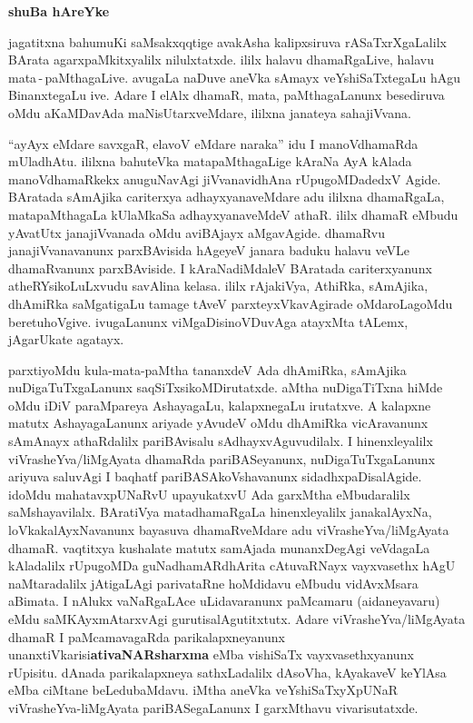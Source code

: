 \begin{center}
{\Huge\bfseries shuBa hAreYke}
\end{center}

\thispagestyle{empty}

\bigskip

jagatitxna bahumuKi saMsakxqqtige avakAsha kalipxsiruva rASaTxrXgaLalilx BArata agarxpaMkitxyalilx nilulxtatxde. ililx halavu dhamaRgaLive, halavu mata\,-\,paMthagaLive. avugaLa naDuve aneVka sAmayx veYshiSaTxtegaLu hAgu BinanxtegaLu ive. Adare I elAlx dhamaR, mata, paMthagaLanunx besediruva oMdu aKaMDavAda maNisUtarxveMdare, ililxna janateya sahajiVvana. 

\medskip

``ayAyx eMdare savxgaR, elavoV eMdare naraka'' idu I manoV\-dhamaRda mUladhAtu. ililxna bahuteVka matapaMthagaLige kAraNa AyA kAlada manoVdhamaRkekx anuguNavAgi jiVvana\-vidhAna rUpugoMDadedxV Agide. BAratada sAmAjika cariterxya adhayxyanaveMdare adu ililxna dhamaRgaLa, matapaMthagaLa kUlaMkaSa \hbox{adhayxyanaveMdeV} athaR. ililx dhamaR eMbudu yAvatUtx janajiVvanada oMdu aviBAjayx aMgavAgide. dhamaRvu janajiVvanavanunx parxBAvisida hAgeyeV janara baduku halavu veVLe dhamaRvanunx parxBAviside. I kAraNadiMdaleV BAratada cariterxyanunx atheRYsikoLuLxvudu savAlina kelasa. ililx \hbox{rAjakiVya}, AthiRka, sAmAjika, dhAmiRka saMgatigaLu tamage tAveV parxteyxVkavAgirade oMdaroLagoMdu beretuhoVgive. ivu\-gaLanunx viMgaDisi\break noVDuvAga atayxMta tALemx, jAgarUkate agatayx.

\medskip

parxtiyoMdu kula-mata-paMtha tananxdeV Ada dhAmiRka, sAmAjika nuDigaTuTxgaLanunx saqSiTxsikoMDirutatxde. aMtha nuDigaTiTxna hiMde oMdu iDiV paraMpareya AshayagaLu, kalapxnegaLu irutatxve. A kalapxne matutx AshayagaLanunx ariyade yAvudeV oMdu dhAmiRka vicAravanunx sAmAnayx athaRdalilx pariBAvisalu sAdhayxvAguvudilalx. I hinenxleyalilx viVrasheYva/liMgAyata dhamaRda pariBASe\-yanunx, nuDigaTuTxgaLanunx ariyuva saluvAgi I baqhatf pariBASAkoVshavanunx sidadhxpaDisalAgide. idoMdu mahatavxpUNaRvU upayukatxvU Ada garxMtha eMbudaralilx saMshayavilalx. BAratiVya matadhamaRgaLa hinenxleyalilx janakalAyxNa, loVkakalAyxNa\-vanunx bayasuva dhamaRveMdare adu viVrasheYva/liMgAyata dhamaR. vaqtitxya kushalate matutx samAjada munanxDegAgi veVdagaLa kAladalilx rUpugoMDa guNadhamARdhArita cAtuvaRNayx vayxvasethx hAgU naMtaradalilx jAtigaLAgi parivataRne hoMdidavu eMbudu \hbox{vidAvxMsara} aBimata. I nAlukx vaNaRgaLAce uLidavaranunx paMcamaru (aidaneyavaru) eMdu saMKAyxmAtarxvAgi gurutisalAgutitxtutx. Adare viVrasheYva/liMgAyata dhamaR I paMcamavagaRda parikalapxneyanunx unanxtiVkarisi\break \textbf{ativaNARsharxma} eMba vishiSaTx vayxvasethxyanunx rUpisitu. dAnada parikalapxneya sathxLadalilx dAsoVha, kAyakaveV keYlAsa eMba ciMtane beLedubaMdavu. iMtha aneVka veYshiSaTxyXpUNaR viVrasheYva-liMgAyata pariBASegaLanunx I garxMthavu vivarisutatxde.


